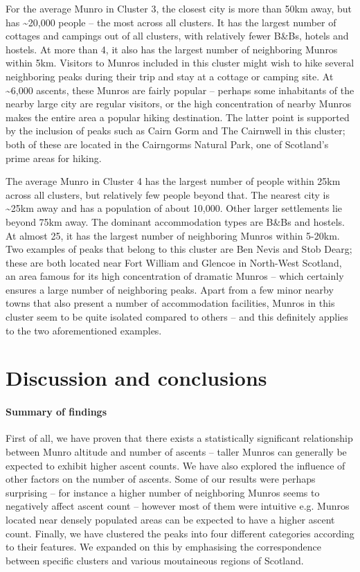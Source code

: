 \documentclass[11pt,a4paper]{article}
\begin{document}
For the average Munro in Cluster 3, the closest city is more than 50km away, but has \textasciitilde 20,000 people – the most across all clusters. It has the largest number of cottages and campings out of all clusters, with relatively fewer B\&Bs, hotels and hostels. At more than 4, it also has the largest number of neighboring Munros within 5km. Visitors to Munros included in this cluster might wish to hike several neighboring peaks during their trip and stay at a cottage or camping site. At \textasciitilde 6,000 ascents, these Munros are fairly popular – perhaps some inhabitants of the nearby large city are regular visitors, or the high concentration of nearby Munros makes the entire area a popular hiking destination. The latter point is supported by the inclusion of peaks such as Cairn Gorm and The Cairnwell in this cluster; both of these are located in the Cairngorms Natural Park, one of Scotland's prime areas for hiking.

The average Munro in Cluster 4 has the largest number of people within 25km across all clusters, but relatively few people beyond that. The nearest city is \textasciitilde 25km away and has a population of about 10,000. Other larger settlements lie beyond 75km away. The dominant accommodation types are B\&Bs and hostels. At almost 25, it has the largest number of neighboring Munros within 5-20km. Two examples of peaks that belong to this cluster are Ben Nevis and Stob Dearg; these are both located near Fort William and Glencoe in North-West Scotland, an area famous for its high concentration of dramatic Munros – which certainly ensures a large number of neighboring peaks. Apart from a few minor nearby towns that also present a number of accommodation facilities, Munros in this cluster seem to be quite isolated compared to others – and this definitely applies to the two aforementioned examples.

\section{Discussion and conclusions}

\paragraph{Summary of findings}
First of all, we have proven that there exists a statistically significant relationship between Munro altitude and number of ascents – taller Munros can generally be expected to exhibit higher ascent counts. We have also explored the influence of other factors on the number of ascents. Some of our results were perhaps surprising – for instance a higher number of neighboring Munros seems to negatively affect ascent count – however most of them were intuitive e.g. Munros located near densely populated areas can be expected to have a higher ascent count. Finally, we have clustered the peaks into four different categories according to their features. We expanded on this by emphasising the correspondence between specific clusters and various moutaineous regions of Scotland.
\end{document}
